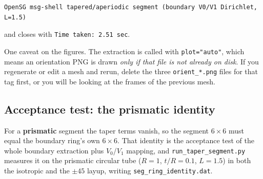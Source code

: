 \begin{Verbatim}[fontsize=\small,frame=single,framesep=4pt]
 OpenSG msg-shell tapered/aperiodic segment (boundary V0/V1 Dirichlet, L=1.5)
\end{Verbatim}

\noindent
and closes with \texttt{Time taken: 2.51 sec}.

One caveat on the figures. The extraction is called with \texttt{plot="auto"},
which means an orientation PNG is drawn \emph{only if that file is not already on
disk}. If you regenerate or edit a mesh and rerun, delete the three
\texttt{orient\_*.png} files for that tag first, or you will be looking at the
frames of the previous mesh.

\subsection{Acceptance test: the prismatic identity}

For a \textbf{prismatic} segment the taper terms vanish, so the segment
$6\times6$ must equal the boundary ring's own $6\times6$. That identity is the
acceptance test of the whole boundary extraction plus $V_0$/$V_1$ mapping, and
\texttt{run\_taper\_segment.py} measures it on the prismatic circular tube
($R=1$, $t/R=0.1$, $L=1.5$) in both the isotropic and the $\pm45$ layup, writing
\texttt{seg\_ring\_identity.dat}.

